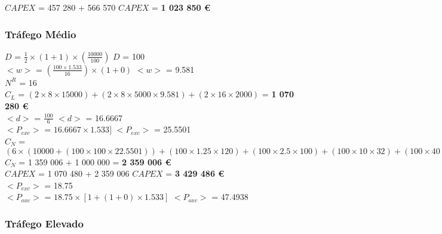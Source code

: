 $CAPEX$ = 457 280 + 566 570 \qquad \qquad $CAPEX$ = \textbf{1 023 850 \euro}\\


\subsubsection{Tráfego Médio}
\vspace{11pt}

$D$ = ${\frac{1}{2}} \times {( 1 + 1 )} \times ( \frac{10000}{100} )$ \qquad \qquad $D$ = 100\\

$<w>$ = $(\frac{100 \times 1.533}{16} ) \times ( 1 + 0)$ \qquad \qquad $<w>$ = 9.581\\

$N^R$ = 16\\

$C_L$ = $(2 \times 8 \times 15 000) + (2 \times 8 \times 5 000 \times 9.581) + (2 \times 16 \times 2000)$ = \textbf{1 070 280 \euro}\\


$<d>$ = $\frac{100}{6}$ \qquad \qquad $<d>$ = 16.6667\\

$<P_{exc}>$ = $16.6667 \times 1.533]$ \qquad \quad $<P_{exc}>$ = 25.5501 \\


$C_N$ = $(6 \times (10 000 + (1 00 \times 100 \times 22.5501)) + (100 \times 1.25 \times 120) + (100 \times 2.5 \times 100) + (100 \times 10 \times 32) + (100 \times 40 \times 12) + (100 \times 100 \times 8)))$\\

$C_N$ = 1 359 006 + 1 000 000 = \textbf{2 359 006 \euro}\\

$CAPEX$ = 1 070 480 + 2 359 006 \qquad \qquad $CAPEX$ = \textbf{3 429 486 \euro}\\

$<P_{exc}>$ = 18.75\\

$<P_{oxc}>$ = $18.75 \times [1 + (1 + 0 ) \times 1.533]$ \qquad \quad $<P_{oxc}>$ = 47.4938 \\


\subsubsection{Tráfego Elevado}
\vspace{11pt}

